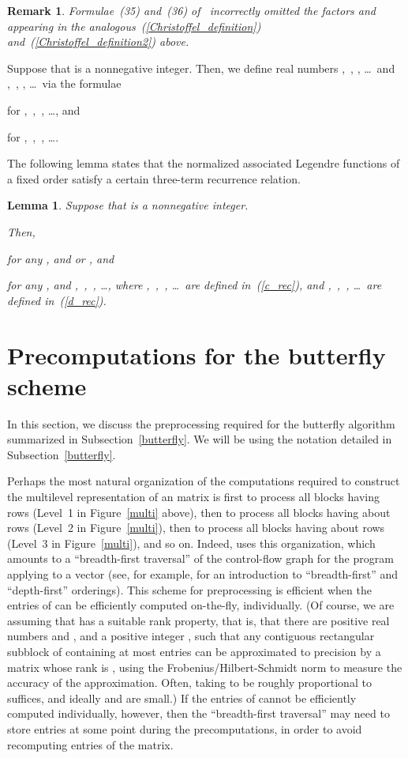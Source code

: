 \documentclass[final,3p,times]{elsarticle}
\newtheorem{lemma1}[theorem]{Lemma}
\newtheorem{remark1}[theorem]{Remark}
\newenvironment{lemma}{\begin{lemma1}}{\end{lemma1}}
\newenvironment{remark}{\begin{remark1}\rm}{\end{remark1}}
\begin{document}
\begin{remark}
Formulae~(35) and~(36) of~\cite{tygert_sph} incorrectly
omitted the factors  and 
appearing in the analogous~(\ref{Christoffel_definition})
and~(\ref{Christoffel_definition2}) above.
\end{remark}


Suppose that  is a nonnegative integer.
Then, we define real numbers ,~, , \dots\
and ,~, , \dots\ via the formulae

for ,~,~, \dots, and

for ,~,~, \dots.


The following lemma states that the normalized associated Legendre functions
of a fixed order  satisfy a certain three-term recurrence relation.

\begin{lemma}
\label{rec_relation}
Suppose that  is a nonnegative integer.

Then,

for any , and  or , and

for any , and ,~,~, \dots,
where ,~,~, \dots\ are defined in~(\ref{c_rec}),
and ,~,~, \dots\ are defined in~(\ref{d_rec}).
\end{lemma}



\section{Precomputations for the butterfly scheme}
\label{precomps}

In this section, we discuss the preprocessing required
for the butterfly algorithm summarized in Subsection~\ref{butterfly}.
We will be using the notation detailed in Subsection~\ref{butterfly}.

Perhaps the most natural organization of the computations required
to construct the multilevel representation of an  matrix 
is first to process all blocks having  rows
(Level~1 in Figure~\ref{multi} above),
then to process all blocks having about  rows
(Level~2 in Figure~\ref{multi}),
then to process all blocks having about  rows
(Level~3 in Figure~\ref{multi}), and so on.
Indeed, \cite{oneil-woolfe-rokhlin} uses this organization,
which amounts to a ``breadth-first traversal''
of the control-flow graph for the program applying  to a vector
(see, for example, \cite{aho-hopcroft-ullman}
for an introduction to ``breadth-first'' and ``depth-first'' orderings).
This scheme for preprocessing is efficient when the entries of 
can be efficiently computed on-the-fly, individually.
(Of course, we are assuming that  has a suitable rank property, that is,
that there are positive real numbers  and ,
and a positive integer , such that
any contiguous rectangular subblock of  containing at most  entries
can be approximated to precision  by a matrix whose rank is ,
using the Frobenius/Hilbert-Schmidt norm to measure the accuracy
of the approximation. Often, taking  to be roughly proportional
to  suffices, and ideally  and  are small.)
If the entries of  cannot be efficiently computed individually,
however, then the ``breadth-first traversal'' may need
to store  entries at some point during the precomputations,
in order to avoid recomputing entries of the matrix.
\end{document}
